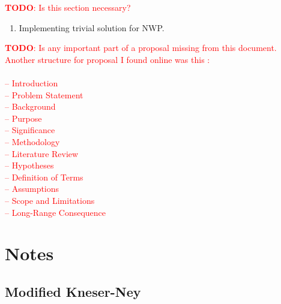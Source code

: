 \documentclass[11pt,a4paper]{article}
\newcommand{\todo}[1]{\textcolor{red}{\textbf{TODO}: #1}}
\begin{document}
\todo{Is this section necessary?}

\begin{enumerate}
  \item Implementing trivial solution for NWP.
\end{enumerate}

\todo{Is any important part of a proposal missing from this document. Another
structure for proposal I found online was this :\\
\\
-- Introduction \\
-- Problem Statement \\
-- Background \\
-- Purpose \\
-- Significance \\
-- Methodology \\
-- Literature Review \\
-- Hypotheses \\
-- Definition of Terms \\
-- Assumptions \\
-- Scope and Limitations \\
-- Long-Range Consequence
}

\printbibliography

\clearpage
\section{Notes}

\subsection{Modified Kneser-Ney}
\end{document}
